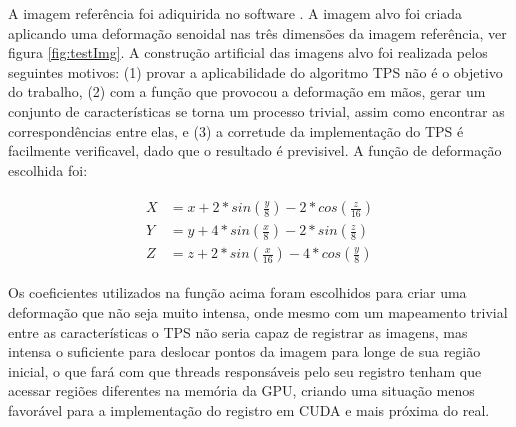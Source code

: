   A imagem referência foi adiquirida no software \cite{papademetris2005bioimage}.
A imagem alvo foi criada aplicando uma deformação senoidal nas três dimensões da
imagem referência, ver figura \ref{fig:testImg}. A construção artificial das
imagens alvo foi realizada pelos seguintes motivos: (1) provar a aplicabilidade
do algoritmo TPS não é o objetivo do trabalho, (2) com a função que provocou a
deformação em mãos, gerar um conjunto de características se torna um processo
trivial, assim como encontrar as correspondências entre elas, e (3) a corretude
da implementação do TPS é facilmente verificavel, dado que o resultado é
previsivel. A função de deformação escolhida foi:

\begin{align} \label{math:composta}
\begin{split}
  X &= x + 2*sin(\frac{y}{8}) - 2*cos(\frac{z}{16}) \\
  Y &= y + 4*sin(\frac{x}{8}) - 2*sin(\frac{z}{8}) \\
  Z &= z + 2*sin(\frac{x}{16}) - 4*cos(\frac{y}{8})
\end{split}
\end{align}

  Os coeficientes utilizados na função acima foram escolhidos para criar uma
deformação que não seja muito intensa, onde mesmo com um mapeamento trivial
entre as características o TPS não seria capaz de registrar as imagens, mas
intensa o suficiente para deslocar pontos da imagem para longe de sua região
inicial, o que fará com que threads responsáveis pelo seu registro tenham que
acessar regiões diferentes na memória da GPU, criando uma situação menos
favorável para a implementação do registro em CUDA e mais próxima do real.

